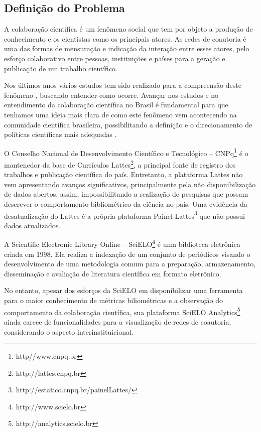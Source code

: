 \documentclass[12pt]{article}
\begin{document}
\subsection{\textbf{Definição do Problema}}

A colaboração científica é um fenômeno social que tem  por objeto a produção de conhecimento e os cientistas como os principais atores. As redes de coautoria é uma das formas de mensuração e indicação da interação entre esses atores, pelo esforço colaborativo entre pessoas, instituições e países para a geração e publicação de um trabalho científico.

Nos últimos anos vários estudos tem sido realizado para a compreensão deste fenômeno \citep{Maia2008}, buscando entender como ocorre. 
Avançar nos estudos e no entendimento da colaboração científica no Brasil é fundamental para que tenhamos uma ideia mais clara de como este fenômeno vem acontecendo na comunidade científica brasileira, possibilitando a definição e o direcionamento de políticas científicas mais adequadas \cite{Vanz2010}.

O Conselho Nacional de Desenvolvimento Científico e Tecnológico -- CNPq\footnote{http//www.cnpq.br} é o mantenedor da base de Currículos Lattes\footnote{http://lattes.cnpq.br}, a principal fonte de registro dos trabalhos e publicação científica do país. 
Entretanto, a plataforma Lattes não vem apresentando avanços significativos, principalmente pela não disponibilização de dados abertos, assim, impossibilitando a realização de pesquisas que possam descrever o comportamento bibliométrico da ciência no país.
Uma evidência da desatualização do Lattes é a própria plataforma Painel Lattes\footnote{http://estatico.cnpq.br/painelLattes/} que não possui dados atualizados.

A Scientific Electronic Library Online -- SciELO\footnote{http://www.scielo.br} é uma biblioteca eletrônica criada em 1998.
Ela realiza a indexação de um conjunto de periódicos visando o desenvolvimento de uma metodologia comum para a preparação, armazenamento, disseminação e avaliação de literatura científica em formato eletrônico.

No entanto, apesar dos esforços da SciELO em disponibilizar uma ferramenta para o maior conhecimento de métricas biliométricas e a observação do comportamento da colaboração científica, sua plataforma SciELO Analytics\footnote{http://analytics.scielo.br} ainda carece de funcionalidades para a visualização de redes de coautoria, considerando o aspecto interinstituicional.
\end{document}
